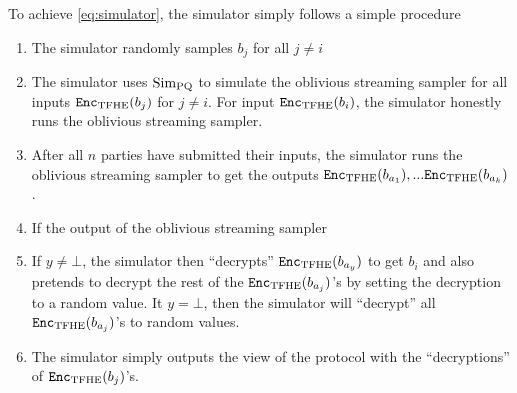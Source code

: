 To achieve \cref{eq:simulator}, the simulator simply follows a simple procedure
\begin{enumerate}
	\item The simulator randomly samples $b_j$ for all $j \neq i$
	\item The simulator uses $\text{Sim}_\text{PQ}$ to simulate the oblivious streaming sampler for all inputs $\texttt{Enc}_{\mathrm{TFHE}}(b_j)$ for $j \neq i$.
	For input $\texttt{Enc}_{\mathrm{TFHE}}(b_i)$, the simulator honestly runs the oblivious streaming sampler.
	\item After all $n$ parties have submitted their inputs, the simulator runs the oblivious streaming sampler to get the outputs $\texttt{Enc}_{\mathrm{TFHE}}(b_{a_1}),... \texttt{Enc}_{\mathrm{TFHE}}(b_{a_k})$.
	\item If the output of the oblivious streaming sampler 
	\item If $y \neq \bot$, the simulator then ``decrypts'' $\texttt{Enc}_{\mathrm{TFHE}}(b_{a_y})$ to get $b_i$ and also pretends to decrypt the rest of the $\texttt{Enc}_{\mathrm{TFHE}}(b_{a_j})$'s by setting the decryption to a random value.
	It $y = \bot$, then the simulator will ``decrypt'' all $\texttt{Enc}_{\mathrm{TFHE}}(b_{a_j})$'s to random values.
	\item The simulator simply outputs the view of the protocol with the ``decryptions'' of $\texttt{Enc}_{\mathrm{TFHE}}(b_j)$'s.
\end{enumerate}

